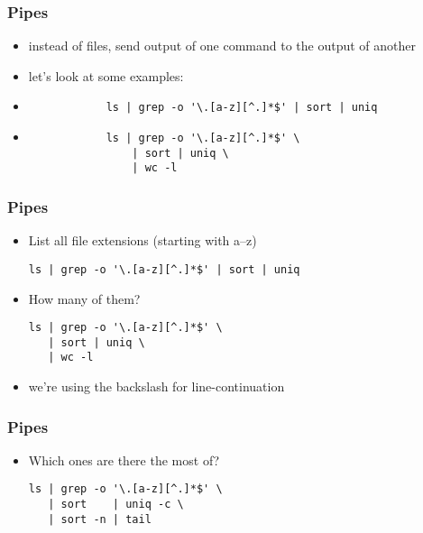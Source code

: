 \documentclass[%
        hyperref={%
                pdfauthor={Zakariyya Mughal},%
                pdfpagemode={None},pdfpagelayout={SinglePage}}%
        xcolor={x11names},%
]{beamer}
\begin{document}
\begin{frame}[fragile]
	\frametitle{Pipes}
	\begin{itemize}
		\item instead of files, send output of one command
			to the output of another
		\item let's look at some examples:

		\item \begin{lstlisting}
			ls | grep -o '\.[a-z][^.]*$' | sort | uniq
			\end{lstlisting}
		\pause\item \begin{lstlisting}
			ls | grep -o '\.[a-z][^.]*$' \
				| sort | uniq \
				| wc -l
			\end{lstlisting}
	\end{itemize}
\end{frame}
\begin{frame}[fragile]
	\frametitle{Pipes}
	\begin{itemize}
		\item List all file extensions (starting with a--z)
\begin{lstlisting}
ls | grep -o '\.[a-z][^.]*$' | sort | uniq
\end{lstlisting}
		\pause\item How many of them?
\begin{lstlisting}
ls | grep -o '\.[a-z][^.]*$' \
   | sort | uniq \
   | wc -l
\end{lstlisting}
		\item we're using the backslash for line-continuation
	\end{itemize}
\end{frame}
\begin{frame}[fragile]
	\frametitle{Pipes}
	\begin{itemize}
		\item Which ones are there the most of?
\begin{lstlisting}
ls | grep -o '\.[a-z][^.]*$' \
   | sort    | uniq -c \
   | sort -n | tail
\end{lstlisting}
	\end{itemize}
\end{frame}


\end{document}

